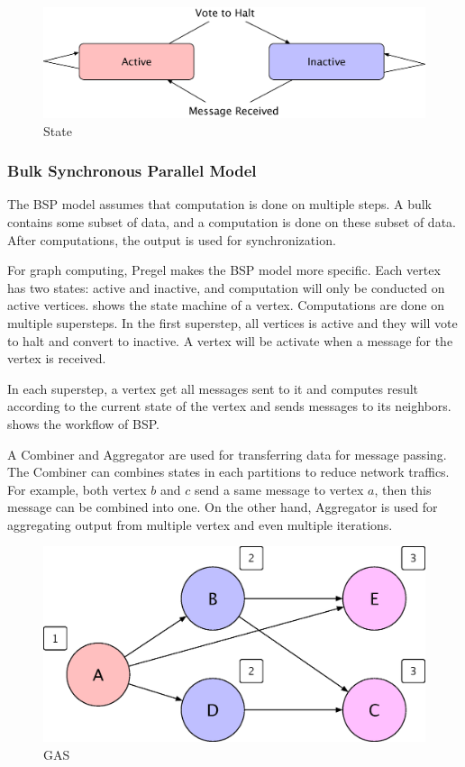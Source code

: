 \begin{figure}[tbh]
  \center
  \includegraphics[width=.8\linewidth]{figures/state}
  \caption{State}
  \label{fig:state}
\end{figure}

\subsubsection{Bulk Synchronous Parallel Model}
The BSP model assumes that computation is done on multiple steps. A bulk contains
some subset of data, and a computation is done on these subset of data. After
computations, the output is used for synchronization.

For graph computing, Pregel makes the BSP model more specific.
Each vertex has two states: active and inactive, and computation
will only be conducted on active vertices.  shows the
state machine of a vertex. Computations are done on multiple
supersteps. In the first superstep, all vertices is active and they
will vote to halt and convert to inactive. A vertex will be activate
when a message for the vertex is received.

In each superstep, a vertex get all messages sent to it and computes
result according to the current state of the vertex and sends messages
to its neighbors.  shows the workflow of BSP.

A Combiner and Aggregator are used for transferring data for message
passing. The Combiner can combines states in each partitions to reduce
network traffics. For example, both vertex $b$ and $c$ send a same
message to vertex $a$, then this message can be combined into one.
On the other hand, Aggregator is used for aggregating output from multiple
vertex and even multiple iterations.

\begin{figure}[tbh]
  \center
  \includegraphics[width=.8\linewidth]{figures/gas}
  \caption{GAS}
  \label{fig:gas}
\end{figure}

